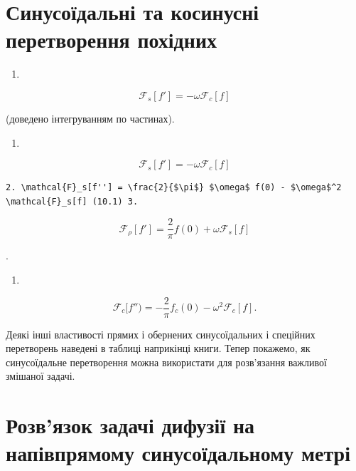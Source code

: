 \documentclass[
  ukrainian,
]{article}
\providecommand{\tightlist}{%
  \setlength{\itemsep}{0pt}\setlength{\parskip}{0pt}}
\begin{document}
\section{Синусоїдальні та косинусні перетворення
похідних}\label{ux441ux438ux43dux443ux441ux43eux457ux434ux430ux43bux44cux43dux456-ux442ux430-ux43aux43eux441ux438ux43dux443ux441ux43dux456-ux43fux435ux440ux435ux442ux432ux43eux440ux435ux43dux43dux44f-ux43fux43eux445ux456ux434ux43dux438ux445}

\begin{enumerate}
\def\labelenumi{\arabic{enumi}.}
\tightlist
\item
\end{enumerate}

\[
\mathcal{F}_s[f'] = -\omega \mathcal{F}_c[f]
\]

(доведено інтегруванням по частинах).

\begin{enumerate}
\def\labelenumi{\arabic{enumi}.}
\tightlist
\item
\end{enumerate}

\[
\mathcal{F}_s[f'] = -\omega \mathcal{F}_c[f]
\]

\begin{verbatim}
2. \mathcal{F}_s[f''] = \frac{2}{$\pi$} $\omega$ f(0) - $\omega$^2 \mathcal{F}_s[f] (10.1) 3.
\end{verbatim}

\[
\mathcal{F}_{\rho}[f'] = \frac{2}{\pi} f(0) + \omega \mathcal{F}_{s}[f]
\]

.

\begin{enumerate}
\def\labelenumi{\arabic{enumi}.}
\setcounter{enumi}{3}
\tightlist
\item
\end{enumerate}

\[
\mathcal{F}_{c}[f'') = -\frac{2}{\pi} f_{c}(0) - \omega^{2} \mathcal{F}_{c}[f].
\]

Деякі інші властивості прямих і обернених синусоїдальних і спеційних
перетворень наведені в таблиці наприкінці книги. Тепер покажемо, як
синусоїдальне перетворення можна використати для розв'язання важливої
змішаної задачі.

\section{Розв'язок задачі дифузії на напівпрямому синусоїдальному
метрі}\label{ux440ux43eux437ux432ux44fux437ux43eux43a-ux437ux430ux434ux430ux447ux456-ux434ux438ux444ux443ux437ux456ux457-ux43dux430-ux43dux430ux43fux456ux432ux43fux440ux44fux43cux43eux43cux443-ux441ux438ux43dux443ux441ux43eux457ux434ux430ux43bux44cux43dux43eux43cux443-ux43cux435ux442ux440ux456}
\end{document}
